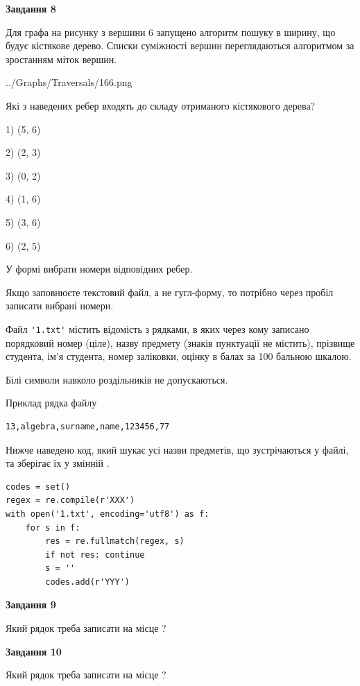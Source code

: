\documentclass[12pt, ukrainian]{article}
\def\code#1{\Verb!#1!}
\begin{document}
{\begin {large}
{\begin {center}\textbf{Завдання 8}\end {center}}\par
Для графа на рисунку з вершини 6 запущено алгоритм пошуку в ширину, що будує кістякове дерево. Списки суміжності вершин переглядаються алгоритмом за зростанням міток вершин.\par
\begin{center}
	{../Graphs/Traversals/166.png}
\end{center}
\par Які з наведених ребер входять до складу отриманого кістякового дерева?\par
1) (5, 6)\par
2) (2, 3)\par
3) (0, 2)\par
4) (1, 6)\par
5) (3, 6)\par
6) (2, 5)\par
{\vskip 15pt} У формі вибрати номери відповідних ребер.


Якщо заповнюєте текстовий файл, а не гугл-форму, то потрібно через пробіл записа\-ти вибрані номери.\par
\newpage


Файл \code{'1.txt'} містить відомість з рядками, в яких через кому записано поряд\-ковий номер (ціле), назву предмету (знаків пунктуації не містить), прізвище студента, ім'я студента, номер заліковки, оцінку в балах за 100 бальною шкалою.

Білі символи навколо роздільників не допускаються.

Приклад рядка файлу



\begin{verbatim}
13,algebra,surname,name,123456,77
\end{verbatim}


Нижче наведено код, який шукає усі назви предметів, що зустрічаються у файлі, та зберігає їх у змінній .



\begin{verbatim}
codes = set()
regex = re.compile(r'XXX')
with open('1.txt', encoding='utf8') as f:
    for s in f:
        res = re.fullmatch(regex, s)
        if not res: continue
        s = ''
        codes.add(r'YYY')
\end{verbatim}


{\begin {center}\textbf{Завдання 9}\end {center}}\par
Який рядок треба записати на місце  ?\par
\vspace{5mm}


{\begin {center}\textbf{Завдання 10}\end {center}}\par
Який рядок треба записати на місце  ?\par


\newpage


\end {large}}
\end{document}
